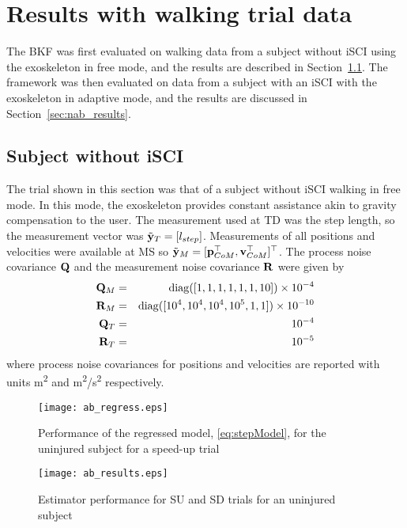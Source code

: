 \section{Results with walking trial data}\label{sec:bkf_results}

The BKF was first evaluated on walking data from a subject without iSCI using the exoskeleton in free mode, and the results are described in Section~\ref{sec:ab_results}. The framework was then evaluated on data from a subject with an iSCI with the exoskeleton in adaptive mode, and the results are discussed in Section~\ref{sec:nab_results}.

\subsection{Subject without iSCI}\label{sec:ab_results}
The trial shown in this section was that of a subject without iSCI walking in free mode. In this mode, the exoskeleton provides constant assistance akin to gravity compensation to the user. The measurement used at TD was the step length, so the measurement vector was $ \tilde{\mathbf{y}}_{T} = [l_{step}] $. Measurements of all positions and velocities were available at MS so $ \tilde{\mathbf{y}}_{M} = [\mathbf{p}_{CoM}^{\top} ,\mathbf{v}_{CoM}^{\top}]^{\top} $. The process noise covariance $ \mathbf{Q} $ and the measurement noise covariance $ \mathbf{R} $ were given by
\begin{eqnarray}
	\Q_M &=& {\rm diag}([1 ,1 ,1 ,1 ,1 ,1 ,10]) \times 10^{-4} \\
	\R_M &=& {\rm diag}([10^{4} ,10^{4} ,10^{4} ,10^{5} ,1 ,1]) \times 10^{-10} \\ %
	\Q_T &=& 10^{-4} \\
	\R_T &=& 10^{-5} %
\end{eqnarray}
where process noise covariances for positions and velocities are reported with units m\textsuperscript{2} and m\textsuperscript{2}/s\textsuperscript{2} respectively.

\begin{figure}
	\centering
	\texttt{[image: ab\_regress.eps]}
	\caption{Performance of the regressed model, \eqref{eq:stepModel}, for the uninjured subject for a speed-up trial} \label{fig:ab_regressor}
\end{figure}

\begin{figure}
	\centering
	\texttt{[image: ab\_results.eps]}
	\caption{Estimator performance for SU and SD trials for an uninjured subject} \label{fig:ab_results}
\end{figure}

